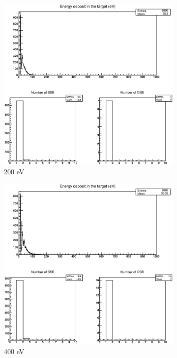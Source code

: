 \begin{figure}
\centering
\begin{subfigure}{.5\textwidth}
  \centering
  \includegraphics[width=.78\linewidth]{./Figures/11.eps}
  \caption{200 eV}
  \label{fig:subi1}
\end{subfigure}%
\begin{subfigure}{.5\textwidth}
  \centering
  \includegraphics[width=.78\linewidth]{./Figures/22.eps}
  \caption{400 eV}
  \label{fig:subi2}
\end{subfigure}
\begin{subfigure}{.5\textwidth}
  \centering

\end{subfigure}
\end{figure}
